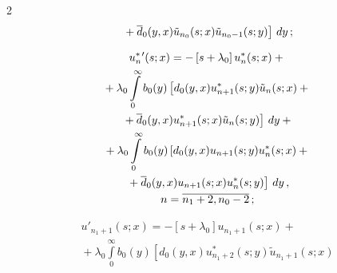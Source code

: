 \begin{multicols}{2}
\begin{multline*}
\left.{}+ \d_0(y,x) \tilde{u}_{n_0}(s;x) \tilde{u}_{n_0-1}(s;y)\right]\, dy \,;


\end{multline*}







\vspace*{-12pt}





\noindent


\begin{multline*}


u^{*\,\prime}_n(s;x) = - \left[s + \lambda_0\right] u^*_{n}(s;x)


+{}


\\


{}+ \lambda_0 \int\limits_0^\infty b_0(y) \left[d_0(y,x) u^*_{n+1}(s;y) \tilde{u}_n(s;x)


+ {}\right.\\


\left.{}+\d_0(y,x) u^*_{n+1}(s;x) \tilde{u}_n(s;y)\right] \, dy +{}\\


{}+


\lambda_0 \int\limits_0^\infty b_0(y) \left[d_0(y,x) u_{n+1}(s;y) u^*_{n}(s;x)


+{}\right.\\


\left.{}+\d_0(y,x) u_{n+1}(s;x) u^*_{n}(s;y)\right]\, dy\,,


\\ n=\overline{n_1+2,n_0-2}\,;


\end{multline*}







\vspace*{-24pt}





\noindent


\begin{multline*}


u'_{n_1+1}(s;x) = - \left[s + \lambda_0\right] u_{n_1+1}(s;x) +{}


\\


{}+


\lambda_0 \int\limits_0^\infty b_0(y) \left[d_0(y,x) u^*_{n_1+2}(s;y) \tilde{u}_{n_1+1}(s;x)



\end{multline*}
\end{multicols}
